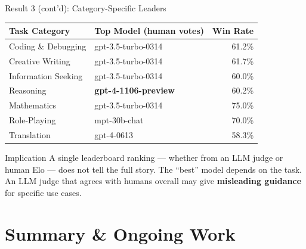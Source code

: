 \documentclass[aspectratio=169,11pt]{beamer}
\begin{document}
\begin{frame}{Result 3 (cont'd): Category-Specific Leaders}

{\small
\begin{tabular}{@{}llr@{}}
\toprule
\textbf{Task Category} & \textbf{Top Model (human votes)} & \textbf{Win Rate} \\
\midrule
Coding \& Debugging & gpt-3.5-turbo-0314 & 61.2\% \\
Creative Writing & gpt-3.5-turbo-0314 & 61.7\% \\
Information Seeking & gpt-3.5-turbo-0314 & 60.0\% \\
Reasoning & \textbf{gpt-4-1106-preview} & 60.2\% \\
Mathematics & gpt-3.5-turbo-0314 & 75.0\% \\
Role-Playing & mpt-30b-chat & 70.0\% \\
Translation & gpt-4-0613 & 58.3\% \\
\bottomrule
\end{tabular}
}

\vspace{0.5em}
\begin{block}{Implication}
A single leaderboard ranking --- whether from an LLM judge or human Elo --- does not tell the full story. The ``best'' model depends on the task. An LLM judge that agrees with humans overall may give \textbf{misleading guidance} for specific use cases.
\end{block}
\end{frame}

\section{Summary \& Ongoing Work}
\end{document}
